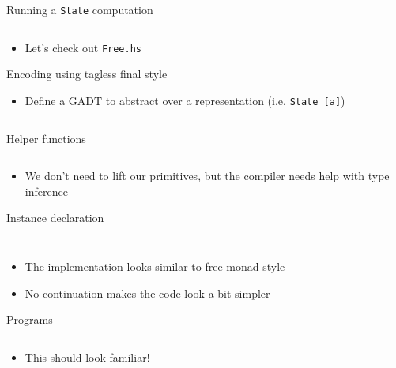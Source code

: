 \documentclass[hyperref={pdfpagelabels=false},12pt]{beamer}
\newcommand{\code}[2]{\texttt{#2}}
\newcommand{\haskell}[1]{\code{haskell}{#1}}
\newcommand{\bash}[1]{\code{bash}{#1}}
\newcommand{\pygmentLines}[5]{\inputminted[bgcolor=lightgray,linenos,fontsize=#1,firstline=#2,lastline=#3,autogobble]{#4}{#5}}
\begin{document}
\begin{frame}{Running a \haskell{State} computation}
  \pygmentLines{\normalsize}{58}{62}{haskell}{code/Free.hs}
  \begin{itemize}
    \item Let's check out \bash{Free.hs}
  \end{itemize}
\end{frame}

\begin{frame}{Encoding using tagless final style}
  \begin{itemize}
    \item Define a GADT to abstract over a representation (i.e. \haskell{State [a]})
  \end{itemize}
  \pygmentLines{\normalsize}{16}{19}{haskell}{code/TaglessFinal.hs}
\end{frame}

\begin{frame}{Helper functions}
  \pygmentLines{\normalsize}{28}{35}{haskell}{code/TaglessFinal.hs}
  \begin{itemize}
    \item We don't need to lift our primitives, but the compiler needs help
      with type inference
  \end{itemize}
\end{frame}

\begin{frame}{Instance declaration}
  \pygmentLines{\normalsize}{14}{14}{haskell}{code/TaglessFinal.hs}
  \vspace{-1cm}
  \pygmentLines{\normalsize}{21}{26}{haskell}{code/TaglessFinal.hs}
  \vspace{-0.5cm}
  \begin{itemize}
    \item The implementation looks similar to free monad style
    \item No continuation makes the code look a bit simpler
  \end{itemize}
\end{frame}

\begin{frame}{Programs}
  \pygmentLines{\scriptsize}{37}{51}{haskell}{code/TaglessFinal.hs}
  \vspace{-0.5cm}
  \begin{itemize}
    \item This should look familiar!
  \end{itemize}
\end{frame}
\end{document}
